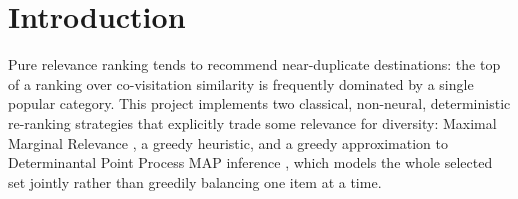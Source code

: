\section{Introduction}
Pure relevance ranking tends to recommend near-duplicate destinations: the
top of a ranking over co-visitation similarity is frequently dominated by a
single popular category. This project implements two classical,
non-neural, deterministic re-ranking strategies that explicitly trade some
relevance for diversity: Maximal Marginal Relevance
\cite{carbonell1998mmr}, a greedy heuristic, and a greedy approximation to
Determinantal Point Process MAP inference \cite{kulesza2012dpp}, which
models the whole selected set jointly rather than greedily balancing one
item at a time.

